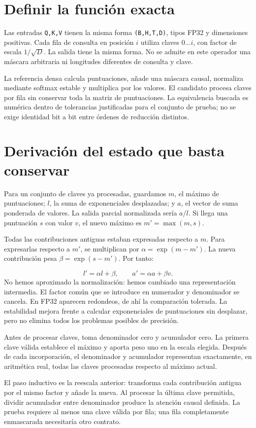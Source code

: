 \documentclass[12pt,a4paper,oneside]{report}
\begin{document}
\section{Definir la función exacta}
Las entradas \texttt{Q,K,V} tienen la misma forma \texttt{(B,H,T,D)}, tipos FP32 y dimensiones positivas. Cada fila de consulta en posición $i$ utiliza claves $0\ldots i$, con factor de escala $1/\sqrt D$. La salida tiene la misma forma. No se admite en este operador una máscara arbitraria ni longitudes diferentes de consulta y clave.

La referencia densa calcula puntuaciones, añade una máscara causal, normaliza mediante softmax estable y multiplica por los valores. El candidato procesa claves por fila sin conservar toda la matriz de puntuaciones. La equivalencia buscada es numérica dentro de tolerancias justificadas para el conjunto de prueba; no se exige identidad bit a bit entre órdenes de reducción distintos.

\section{Derivación del estado que basta conservar}
Para un conjunto de claves ya procesadas, guardamos $m$, el máximo de puntuaciones; $l$, la suma de exponenciales desplazadas; y $a$, el vector de suma ponderada de valores. La salida parcial normalizada sería $a/l$. Si llega una puntuación $s$ con valor $v$, el nuevo máximo es $m'=\max(m,s)$.

Todas las contribuciones antiguas estaban expresadas respecto a $m$. Para expresarlas respecto a $m'$, se multiplican por $\alpha=\exp(m-m')$. La nueva contribución pesa $\beta=\exp(s-m')$. Por tanto:

\[
l'=\alpha l+\beta,\qquad a'=\alpha a+\beta v.
\]
No hemos aproximado la normalización: hemos cambiado una representación intermedia. El factor común que se introduce en numerador y denominador se cancela. En FP32 aparecen redondeos, de ahí la comparación tolerada. La estabilidad mejora frente a calcular exponenciales de puntuaciones sin desplazar, pero no elimina todos los problemas posibles de precisión.

\begin{ejemplo}
Antes de procesar claves, toma denominador cero y acumulador cero. La primera clave válida establece el máximo y aporta peso uno en la escala elegida. Después de cada incorporación, el denominador y acumulador representan exactamente, en aritmética real, todas las claves procesadas respecto al máximo actual.

El paso inductivo es la reescala anterior: transforma cada contribución antigua por el mismo factor y añade la nueva. Al procesar la última clave permitida, dividir acumulador entre denominador produce la atención causal definida. La prueba requiere al menos una clave válida por fila; una fila completamente enmascarada necesitaría otro contrato.

\end{ejemplo}
\end{document}
